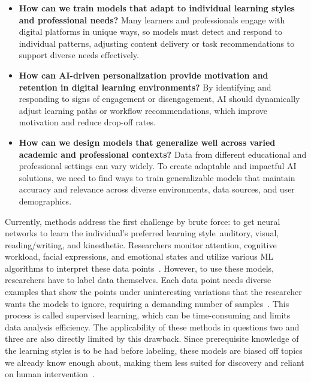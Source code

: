\documentclass{article}
\begin{document}
\begin{itemize}
    \item \textbf{How can we train models that adapt to individual learning styles and professional needs?} \newline 
    Many learners and professionals engage with digital platforms in unique ways, so models must detect and respond to 
    individual patterns, adjusting content delivery or task recommendations to support diverse needs effectively. 
    \item \textbf{How can AI-driven personalization provide motivation and retention in digital learning environments?} \newline 
    By identifying and responding to signs of engagement or disengagement, AI should dynamically adjust learning paths or 
    workflow recommendations, which improve motivation and reduce drop-off rates. 
    \item \textbf{How can we design models that generalize well across varied academic and professional contexts?} \newline 
    Data from different educational and professional settings can vary widely. To create adaptable and impactful AI 
    solutions, we need to find ways to train generalizable models that maintain accuracy and relevance across diverse environments, 
    data sources, and user demographics. 
\end{itemize}

\indent Currently, methods address the first challenge by brute force: to get neural networks to learn the individual's preferred learning 
style\textemdash~auditory, visual, reading/writing, and kinesthetic. Researchers monitor attention, cognitive workload, facial expressions, 
and emotional states and utilize various ML algorithms to interpret these data 
points~\cite{An-AI-based-learning-style-prediction-model-for-personalized-and-effective-learning}. However, to use these models, researchers 
have to label data themselves. Each data point needs diverse examples that show the points under uninteresting variations that the researcher 
wants the models to ignore, requiring a demanding number of samples~\cite{Deep-learning-is-combined-with-massive-scale-citizen-science}. This 
process is called supervised learning, which can be time-consuming and limits data analysis efficiency. The applicability of these methods in 
questions two and three are also directly limited by this drawback. Since prerequisite knowledge of the learning styles is to be had before 
labeling, these models are biased off topics we already know enough about, making them less suited for discovery and reliant on human 
intervention~\cite{Supervised-learning-with-decision-tree-based-methods-in-computational-and-systems-biology}.
\end{document}
